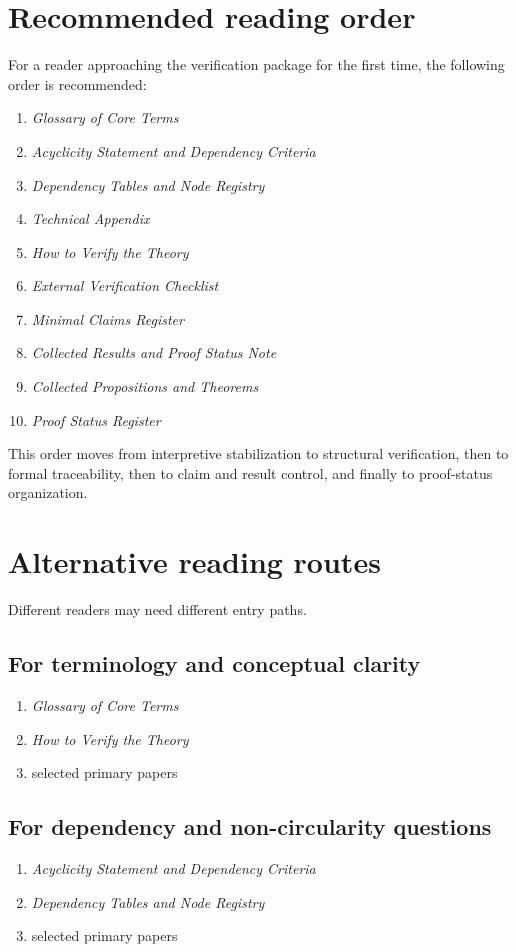 \documentclass[12pt]{article}
\begin{document}
	\section{Recommended reading order}
	
	For a reader approaching the verification package for the first time, the following order is recommended:
	
	\begin{enumerate}[leftmargin=2em]
		\item \emph{Glossary of Core Terms}
		\item \emph{Acyclicity Statement and Dependency Criteria}
		\item \emph{Dependency Tables and Node Registry}
		\item \emph{Technical Appendix}
		\item \emph{How to Verify the Theory}
		\item \emph{External Verification Checklist}
		\item \emph{Minimal Claims Register}
		\item \emph{Collected Results and Proof Status Note}
		\item \emph{Collected Propositions and Theorems}
		\item \emph{Proof Status Register}
	\end{enumerate}
	
	This order moves from interpretive stabilization to structural verification, then to formal
	traceability, then to claim and result control, and finally to proof-status organization.
	
	\section{Alternative reading routes}
	
	Different readers may need different entry paths.
	
	\subsection*{For terminology and conceptual clarity}
	\begin{enumerate}[leftmargin=2em]
		\item \emph{Glossary of Core Terms}
		\item \emph{How to Verify the Theory}
		\item selected primary papers
	\end{enumerate}
	
	\subsection*{For dependency and non-circularity questions}
	\begin{enumerate}[leftmargin=2em]
		\item \emph{Acyclicity Statement and Dependency Criteria}
		\item \emph{Dependency Tables and Node Registry}
		\item selected primary papers
	\end{enumerate}
	
\end{document}

